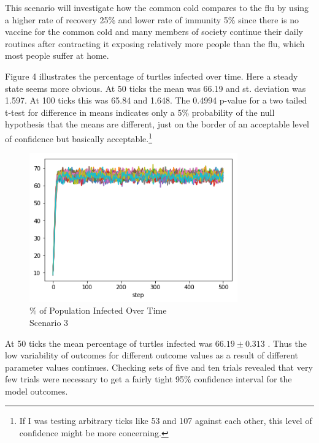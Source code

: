 \documentclass[11pt]{article} %
\begin{document}

This scenario will investigate how the common cold compares to the flu by using a higher rate of recovery 25\% and lower rate of immunity 5\% since there is no vaccine for the common cold and many members of society continue their daily routines after contracting it exposing relatively more people than the flu, which most people suffer at home. 


Figure 4 illustrates the percentage of turtles infected over time. Here a steady state seems more obvious. At 50 ticks the mean was 66.19 and st. deviation was 1.597. At 100 ticks this was 65.84 and 1.648. The 0.4994 p-value for a two tailed t-test for difference in means indicates only a 5\% probability of the null hypothesis that the means are different, just on the border of an acceptable level of confidence but basically acceptable.\footnote{If I was testing arbitrary ticks like 53 and 107 against each other, this level of confidence might be more concerning.}

\begin{figure}
\centering
\includegraphics[width=0.8\textwidth]{20-runs-scenario-3-steady-state}
\caption{\% of Population Infected Over Time \\ Scenario 3}
\end{figure}


At 50 ticks the mean percentage of turtles infected was $66.19  \pm 0.313$ . Thus the low variability of outcomes for different outcome values as a result of different parameter values continues. Checking sets of five and ten trials revealed that very few trials were necessary to get a fairly tight 95\% confidence interval for the model outcomes. 
\end{document}
